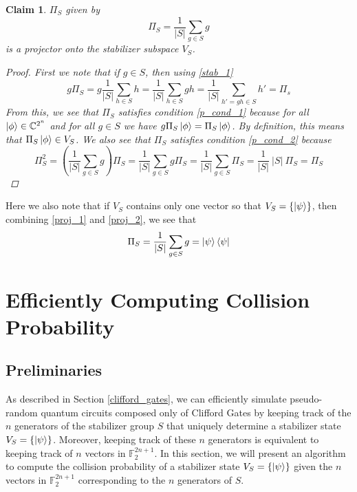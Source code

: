 \documentclass[11pt]{article}
\newtheorem{claim}[thm]{Claim}
\theoremstyle{definition}
\theoremstyle{plain}
\begin{document}
\begin{claim}
$\Pi_S$ given by 
\begin{equation}\label{proj_2}
  \Pi_S = \frac{1}{|S|} \sum\limits_{g \in S} g 
\end{equation}
is a projector onto the stabilizer subspace $V_S$. 
\begin{proof} First we note that if $g \in S$, then using {\ref{stab_1}}
\begin{equation}
  g \Pi_S = g \frac{1}{|S|} \sum\limits_{h \in S} h
  = \frac{1}{|S|} \sum\limits_{h \in S} gh
  = \frac{1}{|S|} \sum\limits_{h' = gh \in S} h'
  = \Pi_s
\end{equation}
From this, we see that $\Pi_S$ satisfies condition {\ref{p_cond_1}} because for all $\ket{\phi} \in \mathbb{C}^{2^n}$ and for all $g \in S$ we have $g \Pi_S \ket{\phi} = \Pi_S \ket{\phi}$. By definition, this means that $\Pi_S \ket{\phi} \in V_S$. We also see that $\Pi_S$ satisfies condition {\ref{p_cond_2}} because
\begin{equation}
  \Pi_S^2 = \left( \frac{1}{|S|} \sum\limits_{g \in S} g \right) \Pi_S 
  = \frac{1}{|S|} \sum\limits_{g \in S} g \Pi_S
  = \frac{1}{|S|} \sum\limits_{g \in S} \Pi_S
  = \frac{1}{|S|} \ |S| \ \Pi_S = \Pi_S 
\end{equation}
\end{proof}
\end{claim}

Here we also note that if $V_S$ contains only one vector so that $V_S = \{ \ket{\psi} \}$, then combining {\ref{proj_1}} and {\ref{proj_2}}, we see that
\begin{equation}\label{proj_3}
    \Pi_S = \frac{1}{|S|} \sum\limits_{g \in S} g = \ket{\psi} \bra{\psi} 
\end{equation}


\section{Efficiently Computing Collision Probability}

\subsection{Preliminaries}
As described in Section {\ref{clifford_gates}}, we can efficiently simulate pseudo-random quantum circuits composed only of Clifford Gates by keeping track of the $n$ generators of the stabilizer group $S$ that uniquely determine a stabilizer state $V_S = \{ \ket{\psi} \}$. Moreover, keeping track of these $n$ generators is equivalent to keeping track of $n$ vectors in $\mathbb{F}_2^{2n+1}$. In this section, we will present an algorithm to compute the collision probability of a stabilizer state $V_S = \{ \ket{\psi} \}$ given the $n$ vectors in $\mathbb{F}_2^{2n+1}$ corresponding to the $n$ generators of $S$.
\end{document}
